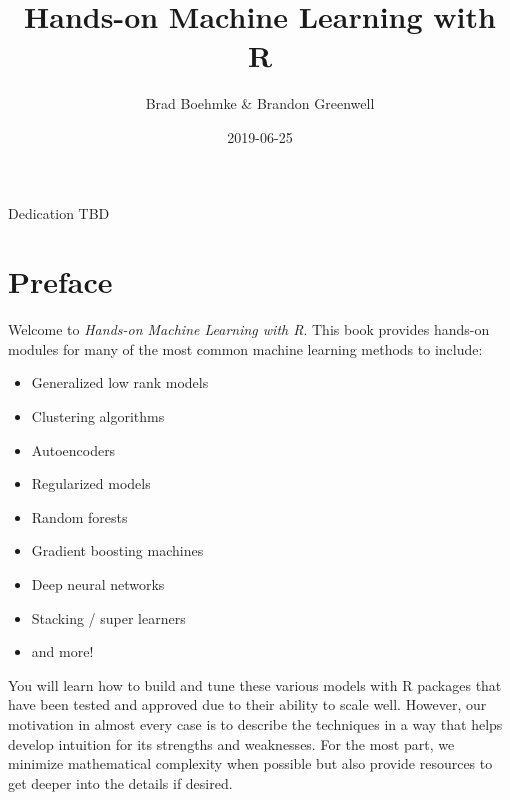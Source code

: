 \documentclass[]{krantz}
\title{Hands-on Machine Learning with R}
\author{Brad Boehmke \& Brandon Greenwell}
\date{2019-06-25}
\providecommand{\tightlist}{%
  \setlength{\itemsep}{0pt}\setlength{\parskip}{0pt}}
\begin{document}
\maketitle


\thispagestyle{empty}

\begin{center}
Dedication TBD
\end{center}

\setlength{\abovedisplayskip}{-5pt}
\setlength{\abovedisplayshortskip}{-5pt}

{
\hypersetup{linkcolor=}
\setcounter{tocdepth}{2}
\tableofcontents
}
\listoftables
\listoffigures
\hypertarget{preface}{%
\chapter*{Preface}\label{preface}}


Welcome to \emph{Hands-on Machine Learning with R}. This book provides hands-on modules for many of the most common machine learning methods to include:

\begin{itemize}
\tightlist
\item
  Generalized low rank models
\item
  Clustering algorithms
\item
  Autoencoders
\item
  Regularized models
\item
  Random forests
\item
  Gradient boosting machines
\item
  Deep neural networks
\item
  Stacking / super learners
\item
  and more!
\end{itemize}

You will learn how to build and tune these various models with R packages that have been tested and approved due to their ability to scale well. However, our motivation in almost every case is to describe the techniques in a way that helps develop intuition for its strengths and weaknesses. For the most part, we minimize mathematical complexity when possible but also provide resources to get deeper into the details if desired.
\end{document}
